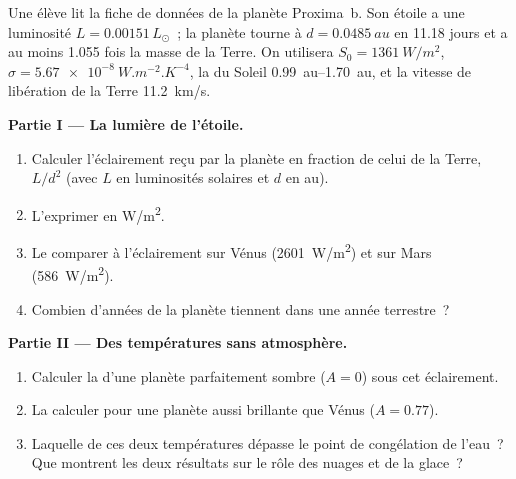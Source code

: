 \begin{problem}
\label{pb:g10:habitable-planet:1}
Une élève lit la fiche de données de la planète Proxima~b. Son étoile a une
luminosité $L = 0.00151\,L_\odot$~; la planète tourne à
$d = \qty{0.0485}{au}$ en 11.18 jours et a au moins 1.055 fois la masse de
la Terre. On utilisera $S_0 = \qty{1361}{W/m^2}$,
$\sigma = \qty{5.67e-8}{W.m^{-2}.K^{-4}}$, la  du Soleil
\qtyrange{0.99}{1.70}{au}, et la vitesse de libération de la Terre
\qty{11.2}{km/s}.

\medskip
\noindent\textbf{Partie I --- La lumière de l'étoile.}
\begin{enumerate}
  \item Calculer l'éclairement reçu par la planète en fraction de celui de
        la Terre, $L/d^2$ (avec $L$ en luminosités solaires et $d$ en au).
  \item L'exprimer en \unit{W/m^2}.
  \item Le comparer à l'éclairement sur Vénus (\qty{2601}{W/m^2}) et sur
        Mars (\qty{586}{W/m^2}).
  \item Combien d'années de la planète tiennent dans une année terrestre~?
\end{enumerate}

\medskip
\noindent\textbf{Partie II --- Des températures sans atmosphère.}
\begin{enumerate}[resume]
  \item Calculer la  d'une planète parfaitement
        sombre ($A = 0$) sous cet éclairement.
  \item La calculer pour une planète aussi brillante que Vénus
        ($A = 0.77$).
  \item Laquelle de ces deux températures dépasse le point de congélation
        de l'eau~? Que montrent les deux résultats sur le rôle des nuages et
        de la glace~?
\end{enumerate}


\end{problem}
